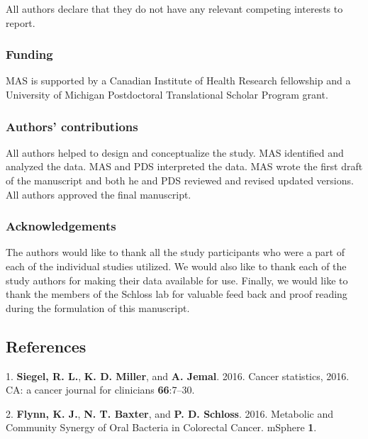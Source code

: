\documentclass[12pt,]{article}
\begin{document}
All authors declare that they do not have any relevant competing
interests to report.

\subsubsection{Funding}\label{funding}

MAS is supported by a Canadian Institute of Health Research fellowship
and a University of Michigan Postdoctoral Translational Scholar Program
grant.

\subsubsection{Authors' contributions}\label{authors-contributions}

All authors helped to design and conceptualize the study. MAS identified
and analyzed the data. MAS and PDS interpreted the data. MAS wrote the
first draft of the manuscript and both he and PDS reviewed and revised
updated versions. All authors approved the final manuscript.

\subsubsection{Acknowledgements}\label{acknowledgements}

The authors would like to thank all the study participants who were a
part of each of the individual studies utilized. We would also like to
thank each of the study authors for making their data available for use.
Finally, we would like to thank the members of the Schloss lab for
valuable feed back and proof reading during the formulation of this
manuscript.

\newpage

\subsection{References}\label{references}

\hypertarget{refs}{}
\hypertarget{ref-siegel_cancer_2016}{}
1. \textbf{Siegel, R. L.}, \textbf{K. D. Miller}, and \textbf{A. Jemal}.
2016. Cancer statistics, 2016. CA: a cancer journal for clinicians
\textbf{66}:7--30.

\hypertarget{ref-flynn_metabolic_2016}{}
2. \textbf{Flynn, K. J.}, \textbf{N. T. Baxter}, and \textbf{P. D.
Schloss}. 2016. Metabolic and Community Synergy of Oral Bacteria in
Colorectal Cancer. mSphere \textbf{1}.
\end{document}
